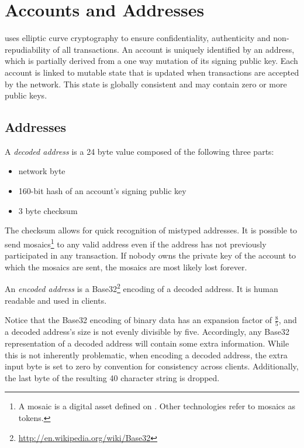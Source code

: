 \section{Accounts and Addresses}
\label{sec:accounts}


\codenamechapterfirstword uses elliptic curve cryptography to ensure confidentiality, authenticity and non-repudiability of all transactions.
An account is uniquely identified by an address, which is partially derived from a one way mutation of its signing public key.
Each account is linked to mutable state that is updated when transactions are accepted by the network.
This state is globally consistent and may contain zero or more public keys.

\subsection{Addresses}

A \emph{decoded address} is a 24 byte value composed of the following three parts:
\begin{itemize}
	\item{network byte}
	\item{160-bit hash of an account's signing public key}
	\item{3 byte checksum}
\end{itemize}

The checksum allows for quick recognition of mistyped addresses.
It is possible to send mosaics\footnote{A mosaic is a digital asset defined on \codename. Other technologies refer to mosaics as tokens.} to any valid address even if the address has not previously participated in any transaction.
If nobody owns the private key of the account to which the mosaics are sent, the mosaics are most likely lost forever.

An \emph{encoded address} is a Base32\footnote{\url{http://en.wikipedia.org/wiki/Base32}} encoding of a decoded address.
It is human readable and used in clients.

Notice that the Base32 encoding of binary data has an expansion factor of $\frac{8}{5}$, and a decoded address's size is not evenly divisible by five.
Accordingly, any Base32 representation of a decoded address will contain some extra information.
While this is not inherently problematic, when encoding a decoded address, the extra input byte is set to zero by convention for consistency across clients.
Additionally, the last byte of the resulting 40 character string is dropped.

